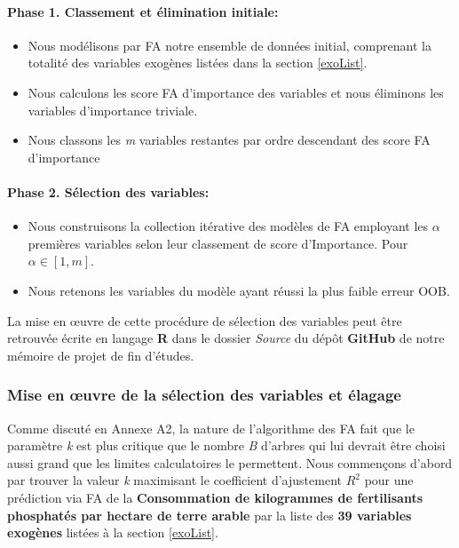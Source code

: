 	\paragraph{Phase 1. Classement et élimination initiale:}\begin{itemize}
	\item Nous modélisons par FA notre ensemble de données initial, comprenant la totalité des variables exogènes listées dans la section \ref{exoList}.
	\item Nous calculons les score FA d'importance des variables et nous éliminons les variables d'importance triviale.
	\item Nous classons les \textit{m} variables restantes par ordre descendant des score FA d'importance
	\end{itemize}
	\paragraph{Phase 2. Sélection des variables:}
	\begin{itemize}
	\item Nous construisons la collection itérative des modèles de FA employant les \textit{$\alpha$} premières variables selon leur classement de score d'Importance. Pour ${\alpha \in [1,\textit{m}]}$.
	\item Nous retenons les variables du modèle ayant réussi la plus faible erreur OOB.
	\end{itemize}
	La mise en œuvre de cette procédure de sélection des variables peut être retrouvée écrite en langage \textbf{R} dans le dossier \textit{Source} du dépôt \textbf{GitHub} de notre mémoire de projet de fin d’études\cite{this}.
	\subsubsection{Mise en œuvre de la sélection des variables et élagage} \label{faout}
	Comme discuté en Annexe A2, la nature de l'algorithme des FA fait que le paramètre \textit{k} est plus critique que le nombre \textit{B} d'arbres qui lui devrait être choisi aussi grand que les limites calculatoires le permettent.
	Nous commençons d'abord par trouver la valeur \textit{k} maximisant le coefficient d'ajustement $R^2$ pour une prédiction via FA de la \textbf{Consommation de kilogrammes de fertilisants phosphatés par hectare de terre arable} par la liste des \textbf{39 variables exogènes} listées à la section \ref{exoList}.
